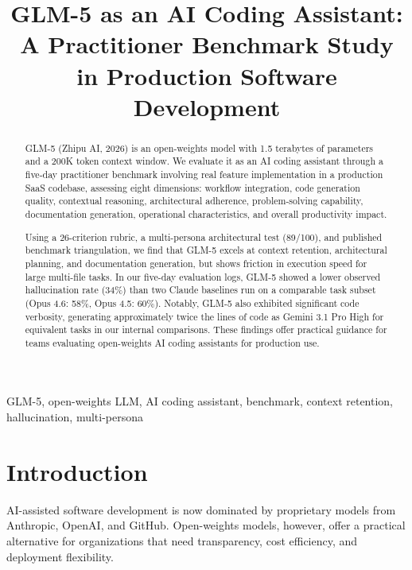 \documentclass[conference]{IEEEtran}
\begin{document}
\title{GLM-5 as an AI Coding Assistant:\\A Practitioner Benchmark Study in Production Software Development}

\author{
}

\maketitle

\begin{abstract}
GLM-5 (Zhipu AI, 2026) is an open-weights model with 1.5 terabytes of parameters and a 200K token context window. We evaluate it as an AI coding assistant through a five-day practitioner benchmark involving real feature implementation in a production SaaS codebase, assessing eight dimensions: workflow integration, code generation quality, contextual reasoning, architectural adherence, problem-solving capability, documentation generation, operational characteristics, and overall productivity impact.

Using a 26-criterion rubric, a multi-persona architectural test (89/100), and published benchmark triangulation, we find that GLM-5 excels at context retention, architectural planning, and documentation generation, but shows friction in execution speed for large multi-file tasks. In our five-day evaluation logs, GLM-5 showed a lower observed hallucination rate (34\%) than two Claude baselines run on a comparable task subset (Opus 4.6: 58\%, Opus 4.5: 60\%). Notably, GLM-5 also exhibited significant code verbosity, generating approximately twice the lines of code as Gemini 3.1 Pro High for equivalent tasks in our internal comparisons. These findings offer practical guidance for teams evaluating open-weights AI coding assistants for production use.
\end{abstract}

\begin{IEEEkeywords}
GLM-5, open-weights LLM, AI coding assistant, benchmark, context retention, hallucination, multi-persona
\end{IEEEkeywords}

\section{Introduction}
AI-assisted software development is now dominated by proprietary models from Anthropic, OpenAI, and GitHub. Open-weights models, however, offer a practical alternative for organizations that need transparency, cost efficiency, and deployment flexibility.
\end{document}
